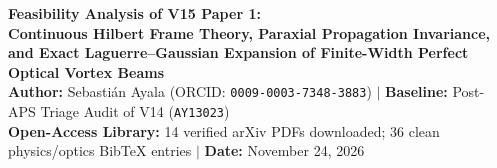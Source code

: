 \documentclass[10pt,letterpaper]{article}
\begin{document}
\begin{center}
  {\LARGE\bfseries\color{navy} Feasibility Analysis of V15 Paper 1:}\\[4pt]
  {\Large\bfseries\color{slate} Continuous Hilbert Frame Theory, Paraxial Propagation Invariance, and Exact Laguerre--Gaussian Expansion of Finite-Width Perfect Optical Vortex Beams}\\[8pt]
  {\small\color{slate}
    \textbf{Author:} Sebasti\'an Ayala (ORCID: \texttt{0009-0003-7348-3883}) \quad$|$\quad
    \textbf{Baseline:} Post-APS Triage Audit of V14 (\texttt{AY13023}) \\[2pt]
    \textbf{Open-Access Library:} 14 verified arXiv PDFs downloaded; 36 clean physics/optics BibTeX entries \quad$|$\quad
    \textbf{Date:} November 24, 2026
  }
\end{center}
\vspace{4pt}
\end{document}
